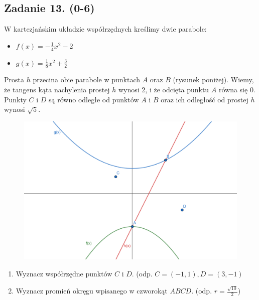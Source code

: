 \subsection*{Zadanie 13. (0-6)}
W kartezjańskim układzie współrzędnych kreślimy dwie parabole:
\begin{itemize}
    \item $f(x) = -\frac{1}{4}x^2-2$
    \item $g(x) = \frac{1}{8}x^2 + \frac{3}{2}$
\end{itemize}
Prosta $h$ przecina obie parabole w punktach $A$ oraz $B$ (rysunek poniżej). Wiemy, że tangens kąta nachylenia prostej $h$ wynosi 2, i że odcięta punktu $A$ równa się $0$. Punkty $C$ i $D$ są równo odległe od punktów $A$ i $B$ oraz ich odległość od prostej $h$ wynosi $\sqrt{5}$. 

\begin{figure}[htbp]
    \centering
    \includegraphics[width=0.6\columnwidth]{figures/zad13.png}
    \label{fig:enter-label}
\end{figure}

\begin{enumerate}
    \item Wyznacz współrzędne punktów $C$ i $D$. (odp. $C=(-1,1), D=(3,-1)$
    \item Wyznacz promień okręgu wpisanego w czworokąt $ABCD$. (odp. $r=\frac{\sqrt{10}}{2}$)

\end{enumerate}
